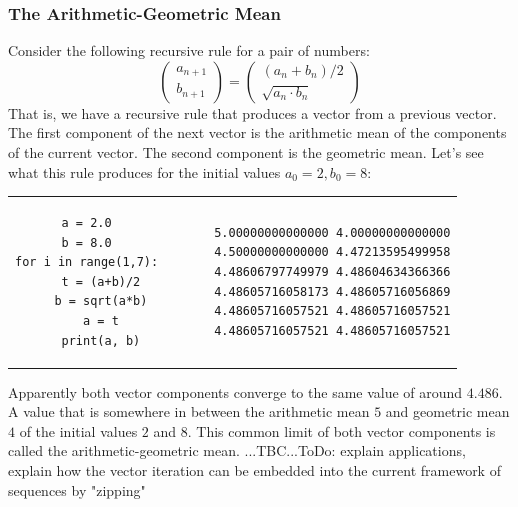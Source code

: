 \subsubsection{The Arithmetic-Geometric Mean}
Consider the following recursive rule for a pair of numbers:
\begin{equation}
\begin{pmatrix} 
a_{n+1} \\ 
b_{n+1}
\end{pmatrix} 
= 
\begin{pmatrix} 
(a_n + b_n)/2 \\ 
\sqrt{a_n \cdot b_n}
\end{pmatrix} 
\end{equation}
That is, we have a recursive rule that produces a vector from a previous vector. The first component of the next vector is the arithmetic mean of the components of the current vector. The second component is the geometric mean. Let's see what this rule produces for the initial values $a_0 = 2, b_0 = 8$:
\begin{center}
\begin{tabular}{ ccccc } 
\begin{lstlisting}
a = 2.0
b = 8.0
for i in range(1,7):
    t = (a+b)/2
    b = sqrt(a*b)
    a = t
    print(a, b)
\end{lstlisting}
& & \vline & &
\begin{lstlisting}
5.00000000000000 4.00000000000000
4.50000000000000 4.47213595499958
4.48606797749979 4.48604634366366
4.48605716058173 4.48605716056869
4.48605716057521 4.48605716057521
4.48605716057521 4.48605716057521
\end{lstlisting}
\end{tabular}
\end{center}
Apparently both vector components converge to the same value of around $4.486$. A value that is somewhere in between the arithmetic mean $5$ and geometric mean $4$ of the initial values $2$ and $8$. This common limit of both vector components is called the arithmetic-geometric mean. ...TBC...ToDo: explain applications, explain how the vector iteration can be embedded into the current framework of sequences by "zipping"



